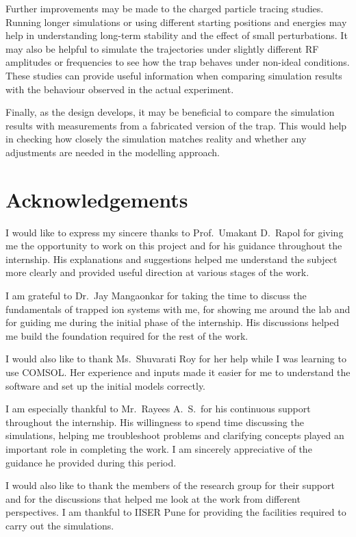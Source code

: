 \documentclass[12pt,a4paper]{report}
\begin{document}
Further improvements may be made to the charged particle tracing studies. Running longer simulations or using different starting positions and energies may help in understanding long-term stability and the effect of small perturbations. It may also be helpful to simulate the trajectories under slightly different RF amplitudes or frequencies to see how the trap behaves under non-ideal conditions. These studies can provide useful information when comparing simulation results with the behaviour observed in the actual experiment.

Finally, as the design develops, it may be beneficial to compare the simulation results with measurements from a fabricated version of the trap. This would help in checking how closely the simulation matches reality and whether any adjustments are needed in the modelling approach.

\chapter*{Acknowledgements}

I would like to express my sincere thanks to Prof.\ Umakant D.\ Rapol for giving me the opportunity to work on this project and for his guidance throughout the internship. His explanations and suggestions helped me understand the subject more clearly and provided useful direction at various stages of the work.

I am grateful to Dr.\ Jay Mangaonkar for taking the time to discuss the fundamentals of trapped ion systems with me, for showing me around the lab and for guiding me during the initial phase of the internship. His discussions helped me build the foundation required for the rest of the work.

I would also like to thank Ms.\ Shuvarati Roy for her help while I was learning to use COMSOL. Her experience and inputs made it easier for me to understand the software and set up the initial models correctly.

I am especially thankful to Mr.\ Rayees A.\ S.\ for his continuous support throughout the internship. His willingness to spend time discussing the simulations, helping me troubleshoot problems and clarifying concepts played an important role in completing the work. I am sincerely appreciative of the guidance he provided during this period.

I would also like to thank the members of the research group for their support and for the discussions that helped me look at the work from different perspectives. I am thankful to IISER Pune for providing the facilities required to carry out the simulations.
\end{document}

